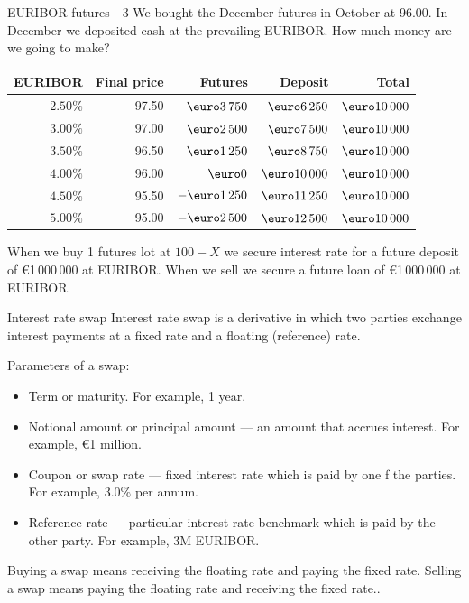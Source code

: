 \documentclass{beamer}
\renewcommand{\EUR}[1]{\textup{\euro}#1}
\begin{document}
\begin{frame}{EURIBOR futures - 3}
\justify
We bought the December futures in October at 96.00. In December we deposited cash at the prevailing EURIBOR. How much money are we going to make?\
\justify
\centering
\begin{tabular}{r|r|r|r|r}
EURIBOR   & Final price & Futures         & Deposit & Total \\ \hline
$2.50\%$ & 97.50        & $\EUR{3\,750}$      &   $\EUR{6\,250}$  & $\EUR{10\,000}$ \\
$3.00\%$ & 97.00        & $\EUR{2\,500}$      &   $\EUR{7\,500}$  & $\EUR{10\,000}$ \\
$3.50\%$ & 96.50        & $\EUR{1\,250}$      & $\EUR{8\,750}$  & $\EUR{10\,000}$ \\
$4.00\%$ & 96.00        & $\EUR{0}$                & $\EUR{10\,000}$  & $\EUR{10\,000}$ \\
$4.50\%$ & 95.50        & $-\EUR{1\,250}$    & $\EUR{11\,250}$ & $\EUR{10\,000}$ \\
$5.00\%$ & 95.00        & $-\EUR{2\,500}$    & $\EUR{12\,500}$ & $\EUR{10\,000}$
\end{tabular}

\justify
When we buy 1 futures lot at $100-X$ we secure interest rate for a future deposit of \EUR{1\,000\,000} at EURIBOR. When we sell we secure a future loan of \EUR{1\,000\,000} at EURIBOR.
\end{frame}



\begin{frame}{Interest rate swap}
\justify
\alert{Interest rate swap} is a derivative in which two parties exchange interest payments at a fixed rate and a floating (reference) rate.

\justify
Parameters of a swap:
\begin{itemize}
\justifying
\item Term or maturity. For example, 1 year.
\item Notional amount or principal amount --- an amount that accrues interest. For example, \EUR{1} million.
\item Coupon or swap rate --- fixed interest rate which is paid by one f the parties. For example, $3.0\%$ per annum.
\item Reference rate --- particular interest rate benchmark which is paid by the other party. For example, 3M EURIBOR.
\end{itemize}

\justify
Buying a swap means receiving the floating rate and paying the fixed rate. Selling a swap means paying the floating rate and receiving the fixed rate..
\end{frame}
\end{document}
